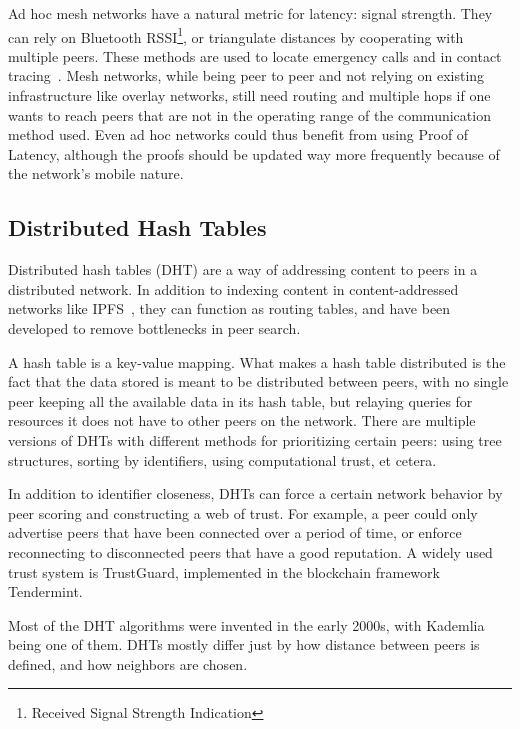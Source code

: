 Ad hoc mesh networks have a natural metric for latency: signal strength. They can rely on Bluetooth RSSI\footnote{Received Signal Strength Indication}, or triangulate distances by cooperating with multiple peers. These methods are used to locate emergency calls and in contact tracing~\cite{Biddle2020-kl}. Mesh networks, while being peer to peer and not relying on existing infrastructure like overlay networks, still need routing and multiple hops if one wants to reach peers that are not in the operating range of the communication method used. Even ad hoc networks could thus benefit from using Proof of Latency, although the proofs should be updated way more frequently because of the network's mobile nature.

\subsection{Distributed Hash Tables}
Distributed hash tables (DHT) are a way of addressing content to peers in a distributed network. In addition to indexing content in content-addressed networks like IPFS~\cite{Labs_undated-uw}, they can function as routing tables, and have been developed to remove bottlenecks in peer search.

A hash table is a key-value mapping. What makes a hash table distributed is the fact that the data stored is meant to be distributed between peers, with no single peer keeping all the available data in its hash table, but relaying queries for resources it does not have to other peers on the network. There are multiple versions of DHTs with different methods for prioritizing certain peers: using tree structures, sorting by identifiers, using computational trust, et cetera.

In addition to identifier closeness, DHTs can force a certain network behavior by peer scoring and constructing a web of trust. For example, a peer could only advertise peers that have been connected over a period of time, or enforce reconnecting to disconnected peers that have a good reputation. A widely used trust system is TrustGuard, implemented in the blockchain framework Tendermint.~\cite{Srivatsa2005-ib, Jeff_Foley2018-zt}

Most of the DHT algorithms were invented in the early 2000s, with Kademlia being one of them. DHTs mostly differ just by how distance between peers is defined, and how neighbors are chosen.~\cite{Cai2015-ra}

